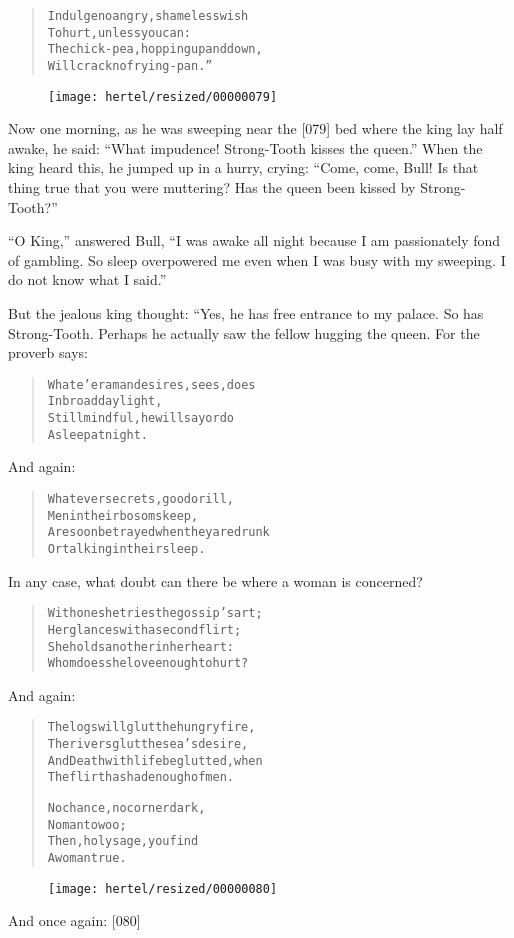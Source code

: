 \documentclass[article, twoside, 10pt]{memoir}
\renewenvironment{verbatim}{%
\begin{quote}%
\vskip -10pt%
\begin{alltt}\normalfont\small}{\end{alltt}%
\end{quote}%
\vskip -10pt
} %
\begin{document}
\begin{verbatim}
Indulge no angry, shameless wish
    To hurt, unless you can:
The chick-pea, hopping up and down,
    Will crack no frying-pan.”
\end{verbatim}
\begin{figure}[p]\texttt{[image: hertel/resized/00000079]}\end{figure}Now one morning, as he was sweeping near the [079] bed where the
king lay half awake, he said:
``What impudence! Strong-Tooth kisses the queen.'' When the king
heard this, he jumped up in a hurry, crying:
``Come, come, Bull! Is that thing true that you were muttering? Has the queen been kissed by Strong-Tooth?''

``O King,'' answered Bull,
``I was awake all night because I am passionately fond of gambling. So sleep overpowered me even when I was busy with my sweeping. I do not know what I said.''

But the jealous king thought: “Yes, he has free entrance to my
palace. So has Strong-Tooth. Perhaps he actually saw the fellow
hugging the queen. For the proverb says:

\begin{verbatim}
Whate'er a man desires, sees, does
    In broad daylight,
Still mindful, he will say or do
    Asleep at night.
\end{verbatim}
And again:

\begin{verbatim}
Whatever secrets, good or ill,
Men in their bosoms keep,
Are soon betrayed when they are drunk
Or talking in their sleep.
\end{verbatim}
In any case, what doubt can there be where a woman is concerned?

\begin{verbatim}
With one she tries the gossip's art;
    Her glances with a second flirt;
She holds another in her heart:
    Whom does she love enough to hurt?
\end{verbatim}
And again:

\begin{verbatim}
The logs will glut the hungry fire,
The rivers glut the sea's desire,
And Death with life be glutted, when
The flirt has had enough of men.

No chance, no corner dark,
    No man to woo;
Then, holy sage, you find
    A woman true.
\end{verbatim}
\begin{figure}[p]\texttt{[image: hertel/resized/00000080]}\end{figure}And once again: [080]
\end{document}
